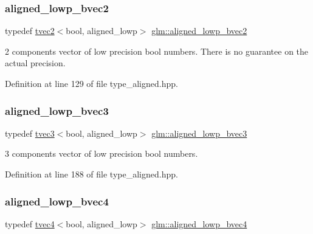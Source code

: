 \subsubsection{\texorpdfstring{aligned\_lowp\_bvec2}{aligned\_lowp\_bvec2}}
{\footnotesize\ttfamily typedef \mbox{\hyperlink{structglm_1_1tvec2}{tvec2}}$<$bool, aligned\+\_\+lowp$>$ \mbox{\hyperlink{group__gtc__type__aligned_gab9dc3bd3ccc5a3a8c30a4bd4b6927782}{glm\+::aligned\+\_\+lowp\+\_\+bvec2}}}

2 components vector of low precision bool numbers. There is no guarantee on the actual precision. 

Definition at line 129 of file type\+\_\+aligned.\+hpp.

\mbox{\label{group__gtc__type__aligned_ga5c8b3197e8ac78252c1b49be19ae0394}} 
\subsubsection{\texorpdfstring{aligned\_lowp\_bvec3}{aligned\_lowp\_bvec3}}
{\footnotesize\ttfamily typedef \mbox{\hyperlink{structglm_1_1tvec3}{tvec3}}$<$bool, aligned\+\_\+lowp$>$ \mbox{\hyperlink{group__gtc__type__aligned_ga5c8b3197e8ac78252c1b49be19ae0394}{glm\+::aligned\+\_\+lowp\+\_\+bvec3}}}



3 components vector of low precision bool numbers. 



Definition at line 188 of file type\+\_\+aligned.\+hpp.

\mbox{\label{group__gtc__type__aligned_ga9de756b9d2ebdf5495b5d1477d124571}} 
\subsubsection{\texorpdfstring{aligned\_lowp\_bvec4}{aligned\_lowp\_bvec4}}
{\footnotesize\ttfamily typedef \mbox{\hyperlink{structglm_1_1tvec4}{tvec4}}$<$bool, aligned\+\_\+lowp$>$ \mbox{\hyperlink{group__gtc__type__aligned_ga9de756b9d2ebdf5495b5d1477d124571}{glm\+::aligned\+\_\+lowp\+\_\+bvec4}}}



